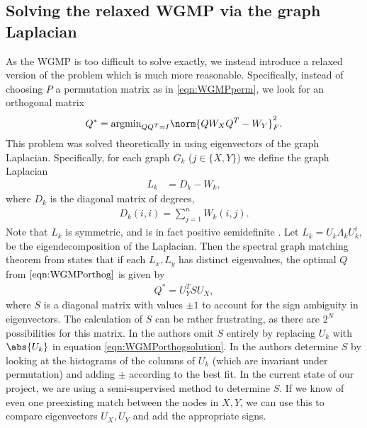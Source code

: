 \documentclass{article}[11pt]
\begin{document}
\subsection{Solving the relaxed WGMP via the graph Laplacian}
\label{subsec:graphLaplacian}
As the WGMP is too difficult to solve exactly, we instead introduce a relaxed
version of the problem which is much more reasonable. Specifically, instead of
choosing $P$ a permutation matrix as in \ref{eqn:WGMPperm}, we look for an
orthogonal matrix
\begin{align}
  \label{eqn:WGMPorthog} Q^* = \text{argmin}_{QQ^T=I}\norm{QW_XQ^T - W_Y}^2_F.
\end{align}
This problem was solved theoretically in \cite{Umeyama1988} using
eigenvectors of the graph Laplacian. Specifically, for each graph $G_k$ ($j \in
\{X, Y\}$) we define the graph Laplacian
\begin{align}
  L_k &= D_k - W_k,
\end{align}
where $D_k$ is the diagonal matrix of degrees,
\begin{align}
  D_k(i,i) = \sum_{j=1}^n W_k(i,j).
\end{align}
Note that $L_k$ is symmetric, and is in fact positive semidefinite
\cite{Mohar91}. Let $L_k = U_k \Lambda_k U_k^t$, be the eigendecomposition of
the Laplacian. Then the spectral graph matching theorem from \cite{Umeyama1988}
states that if each $L_x,L_y$ has distinct eigenvalues, the optimal $Q$ from
$\ref{eqn:WGMPorthog}$ is given by
\begin{align}
  \label{eqn:WGMPorthogsolution} Q^* = U_Y^T S U_X,
\end{align}
where $S$ is a diagonal matrix with values $\pm 1$ to account for the sign
ambiguity in eigenvectors. The calculation of $S$ can be rather frustrating, as
there are $2^N$ possibilities for this matrix. In \cite{Umeyama1988} the authors
omit $S$ entirely by replacing $U_k$ with $\abs{U_k}$ in equation
\ref{eqn:WGMPorthogsolution}. In \cite{Knossow2009} the authors determine $S$ by
looking at the histograms of the columns of $U_k$ (which are invariant under
permutation) and adding $\pm$ according to the best fit. In the current state of
our project, we are using a semi-supervised method to determine $S$. If we know
of even one preexisting match between the nodes in $X, Y$, we can use this to
compare eigenvectors $U_X,U_Y$ and add the appropriate signs.
\end{document}
